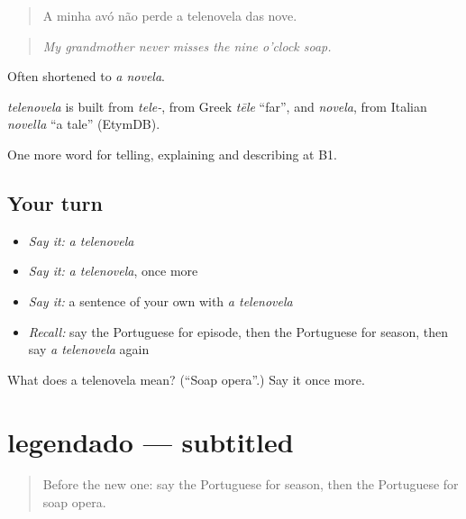 \begin{quote}
A minha avó não perde a telenovela das nove.
\end{quote}

\begin{quote}
\emph{My grandmother never misses the nine o'clock soap.}
\end{quote}

Often shortened to \emph{a novela}.

\begin{cousinweb}
\emph{telenovela} is built from \emph{tele-}, from Greek \emph{tēle} \textquotedblleft{}far\textquotedblright{}, and \emph{novela}, from Italian \emph{novella} \textquotedblleft{}a tale\textquotedblright{} (EtymDB).
\end{cousinweb}

\begin{grammarlens}[title={What you've built}]
One more word for telling, explaining and describing at B1.
\end{grammarlens}

\subsection*{Your turn}
\begin{itemize}
\raggedright
  \item \emph{Say it:} \emph{a telenovela}
  \item \emph{Say it:} \emph{a telenovela}, once more
  \item \emph{Say it:} a sentence of your own with \emph{a telenovela}
  \item \emph{Recall:} say the Portuguese for episode, then the Portuguese for season, then say \emph{a telenovela} again
\end{itemize}

\begin{tcolorbox}[breakable,colback=teal!4,colframe=teal!35!black,title={Before you move on}]
What does a telenovela mean? (\textquotedblleft{}Soap opera\textquotedblright{}.) Say it once more.
\end{tcolorbox}
\section[legendado]{legendado — subtitled}

\label{lesson:PT-C526-legendado}



\begin{quote}
Before the new one: say the Portuguese for season, then the Portuguese for soap opera.
\end{quote}

